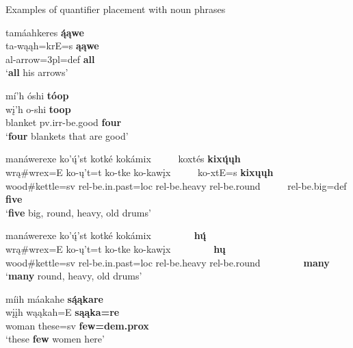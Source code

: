 \begin{exe}
    \item\label{Ch5Quantifiers} Examples of quantifier placement with noun phrases

    \begin{xlist}
        \item\label{Ch5QuantifiersA} \glll tamáahkeres \textbf{ą́ąwe}\\
        ta-wąąh=krE=s \textbf{ąąwe}\\
        al-\textnormal{arrow}=3pl=def \textnormal{\bfseries all}\\
        \glt `\textbf{all} his arrows' \citep[155]{hollow1973a}

        \item\label{Ch5QuantifiersB} \glll mí'h óshi \textbf{tóop}\\
        wį'h o-shi \textbf{toop}\\
        \textnormal{blanket} pv.irr-\textnormal{be.good} \textnormal{\bfseries four}\\
        \glt `\textbf{four} blankets that are good' \citep[35]{hollow1973b}

        \item\label{Ch5QuantifiersC} \glll manáwerexe ko'ų́'st kotké kokámix ~ ~ ~ koxtés \textbf{kixų́ųh}\\
        wrą\#wrex=E ko-ų't=t ko-tke ko-kawįx ~ ~ ~ ko-xtE=s \textbf{kixųųh}\\
        \textnormal{wood}\#\textnormal{kettle}=sv rel-\textnormal{be.in.past}=loc rel-\textnormal{be.heavy} rel-\textnormal{be.round} ~ ~ ~ rel-\textnormal{be.big}=def \textnormal{\bfseries five}\\
        \glt `\textbf{five} big, round, heavy, old drums' \citep[21]{mixco1997a}

        \item\label{Ch5QuantifiersD} \glll manáwerexe ko'ų́'st kotké kokámix ~ ~ ~ ~ ~  \textbf{hų́}\\
        wrą\#wrex=E ko-ų't=t ko-tke ko-kawįx ~ ~ ~ ~ ~ \textbf{hų} \\
    \textnormal{wood}\#\textnormal{kettle}=sv rel-\textnormal{be.in.past}=loc rel-\textnormal{be.heavy} rel-\textnormal{be.round} ~ ~ ~ ~ ~ \textnormal{\bfseries many}\\
        \glt `\textbf{many} round, heavy, old drums' \citep[21]{mixco1997a}

    \item\label{Ch5QuantifiersE} \glll míih máakahe \textbf{są́ąkare}\\
    wįįh wąąkah=E \textbf{sąąka=re}\\
    \textnormal{woman} \textnormal{these}=sv \textbf{\textnormal{few}=dem.prox}\\
    \glt `these \textbf{few} women here' \citep[53]{hollow1973a}


\end{xlist}
\end{exe}
